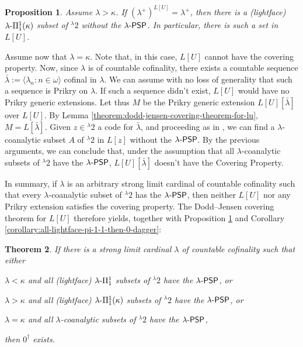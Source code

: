 \documentclass{amsart}
\numberwithin{equation}{section}
\def\hyp{{\hbox{-}}}
\newtheorem{theorem}{Theorem}[section]
\newtheorem{proposition}[theorem]{Proposition}
\theoremstyle{definition}
\theoremstyle{remark}
\newenvironment{enumerate-(1)-r}{\begin{enumerate}[label={\upshape (\arabic*)}, leftmargin=2pc,resume]}{\end{enumerate}}
\begin{document}
\begin{proposition}\label{propoision:no-pi-1-1-in-lu} Assume $\lambda>\kappa$.
	If $(\lambda^{+})^{L[U]}=\lambda^{+}$, then there is a \emph{(lightface)} $\lambda\hyp\Pi^1_1(\kappa)$ 
    subset of ${}^{\lambda}2$ without the $\lambda\hyp\mathsf{PSP}$. In particular, there is such a set in $L[U]$.
\end{proposition}




Assume now that $\lambda=\kappa$. Note that, in this case, $L[U]$ cannot have the covering property. Now, since $\lambda$ is of countable cofinality, there exists a countable sequence $\bar{\lambda}:=\langle\lambda_n:n\in\omega\rangle$ cofinal in $\lambda$. We can assume with no loss of generality that such a sequence is Prikry on $\lambda$. If such a sequence didn't exist, $L[U]$ would have no Prikry generic extensions. Let thus $M$ be the Prikry generic extension $L[U][\bar{\lambda}]$ over $L[U]$. By Lemma \ref{theorem:dodd-jensen-covering-theorem-for-lu}, $M=L[\bar{\lambda}]$. Given $z\in{}^{\lambda}2$ a code for $\bar{\lambda}$, and proceeding as in \cite[Theorem 7.2.12]{DMR}, we can find a $\lambda$-coanalytic subset $A$ of ${}^{\lambda}2$ in $L[z]$ without the $\lambda\hyp\mathsf{PSP}$. By the previous arguments, we can conclude that, under the assumption that all $\lambda$-coanalytic subsets of ${}^{\lambda}2$ have the $\lambda\hyp\mathsf{PSP}$, $L[U][\bar{\lambda}]$ doesn't have the Covering Property. 

In summary, if $\lambda$ is an arbitrary strong limit cardinal of countable cofinality such that every $\lambda$-coanalytic subset of ${}^{\lambda}2$ has the $\lambda\hyp\mathsf{PSP}$, then neither $L[U]$ nor any Prikry extension satisfies the covering property. The Dodd--Jensen covering theorem for $L[U]$ therefore yields, together with Proposition \ref{propoision:no-pi-1-1-in-lu} and Corollary \ref{corollary:all-lightface-pi-1-1-then-0-dagger}:

\begin{theorem}\label{theorem:conditions-0-dagger-exists}
	    If there is a strong limit cardinal $\lambda$ of countable cofinality such that either 
        \begin{enumerate-(1)-r}
            \item  $\lambda<\kappa$ and all (lightface) $\lambda\hyp\Pi^1_1$ subsets of ${}^{\lambda}2$ have the $\lambda\hyp\mathsf{PSP}$, or
            \item  $\lambda>\kappa$ and all (lightface) $\lambda\hyp\Pi^1_1(\kappa)$ subsets of ${}^{\lambda}2$ have the $\lambda\hyp\mathsf{PSP}$, or
            \item  $\lambda=\kappa$ and all $\lambda$-coanalytic subsets of ${}^{\lambda}2$ have the $\lambda\hyp\mathsf{PSP}$,
        \end{enumerate-(1)-r} 
        then $0^{\dagger}$ exists. 
\end{theorem}
\end{document}
